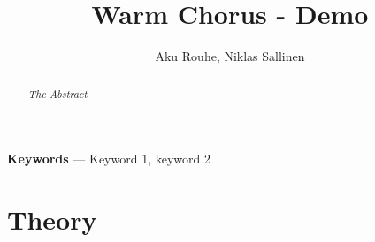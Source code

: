 \documentclass[11pt,a4paper,twoside]{article}
\title{Warm Chorus -  Demo}
\author{Aku Rouhe, Niklas Sallinen}
\begin{document}
\maketitle

\begin{abstract}
\noindent\it The Abstract
\end{abstract}

\noindent\textbf{Keywords} --- Keyword 1, keyword 2


\clearpage
\section{Theory}



\clearpage





\clearpage





\clearpage




\clearpage



\end{document}
